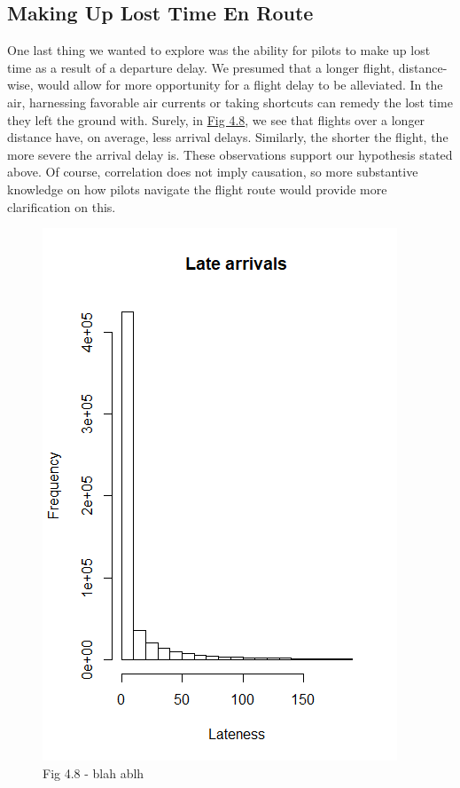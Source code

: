 \documentclass[12pt, a4paper, openany]{book}
\newcommand\tab[1][1cm]{\hspace*{#1}}
\begin{document}
		\subsection{Making Up Lost Time En Route}
			\tab One last thing we wanted to explore was the ability for pilots to make up lost time as a result of a departure delay. We presumed that a longer flight, distance-wise, would allow for more opportunity for a flight delay to be alleviated. In the air, harnessing favorable air currents or taking shortcuts can remedy the lost time they left the ground with. Surely, in \underline{Fig 4.8}, we see that flights over a longer distance have, on average, less arrival delays. Similarly, the shorter the flight, the more severe the arrival delay is. These observations support our hypothesis stated above. Of course, correlation does not imply causation, so more substantive knowledge on how pilots navigate the flight route would provide more clarification on this. \\
			\begin{figure}[h]
	 		\includegraphics[width = 1 \textwidth]{../figures/LateArrivalsHistogram}
	 		\caption{Fig 4.8 - blah ablh}
	 		\end{figure}
	 		
\end{document}
